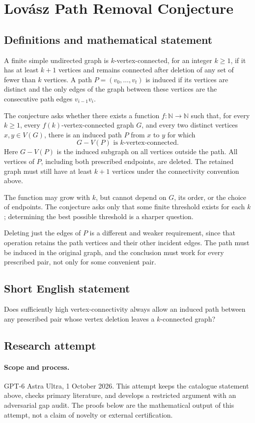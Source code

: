 \documentclass[11pt,a4paper]{article}
\begin{document}
\section*{Lovász Path Removal Conjecture}\label{statement}

\subsection{Definitions and mathematical statement}
A finite simple undirected graph is $k$-vertex-connected, for an integer
$k\ge1$, if it has at least $k+1$ vertices and remains connected after
deletion of any set of fewer than $k$ vertices. A path
$P=(v_0,\ldots,v_t)$ is induced if its vertices are distinct and the
only edges of the graph between these vertices are the consecutive
path edges $v_{i-1}v_i$.

The conjecture asks whether there exists a function
$f:\mathbb N\to\mathbb N$ such that, for every $k\ge1$, every
$f(k)$-vertex-connected graph $G$, and every two distinct vertices
$x,y\in V(G)$, there is an induced path $P$ from $x$ to $y$ for which
\[
 G-V(P)\text{ is }k\text{-vertex-connected}.
\]
Here $G-V(P)$ is the induced subgraph on all vertices outside the path.
All vertices of $P$, including both prescribed endpoints, are deleted.
The retained graph must still have at least $k+1$ vertices under the
connectivity convention above.

The function may grow with $k$, but cannot depend on $G$, its order,
or the choice of endpoints. The conjecture asks only that some finite
threshold exists for each $k$; determining the best possible threshold
is a sharper question.

Deleting just the edges of $P$ is a different and weaker requirement,
since that operation retains the path vertices and their other incident
edges. The path must be induced in the original graph, and the conclusion
must work for every prescribed pair, not only for some convenient pair.
\subsection{Short English statement}
Does sufficiently high vertex-connectivity always allow an induced path between any prescribed pair whose vertex deletion leaves a $k$-connected graph?
\subsection{Research attempt}
\paragraph{Scope and process.}
GPT-6 Astra Ultra, 1 October 2026. This attempt keeps the catalogue statement above, checks primary literature, and develops a restricted argument with an adversarial gap audit. The proofs below are the mathematical output of this attempt, not a claim of novelty or external certification.
\end{document}
